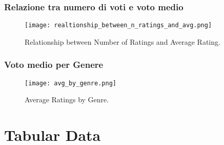 \documentclass[../../Report.tex]{subfiles}
\begin{document}
\subsubsection{Relazione tra numero di voti e voto medio}
\begin{figure}[H]
    \centering
    \texttt{[image: realtionship\_between\_n\_ratings\_and\_avg.png]}
    \caption{Relationship between Number of Ratings and Average Rating.}
    \label{fig:realtionship_between_n_ratings_and_avg}
\end{figure}

\subsubsection{Voto medio per Genere}
\begin{figure}[H]
    \centering
    \texttt{[image: avg\_by\_genre.png]}
    \caption{Average Ratings by Genre.}
    \label{fig:avg_by_genre}
\end{figure}


\section{Tabular Data}
\end{document}
